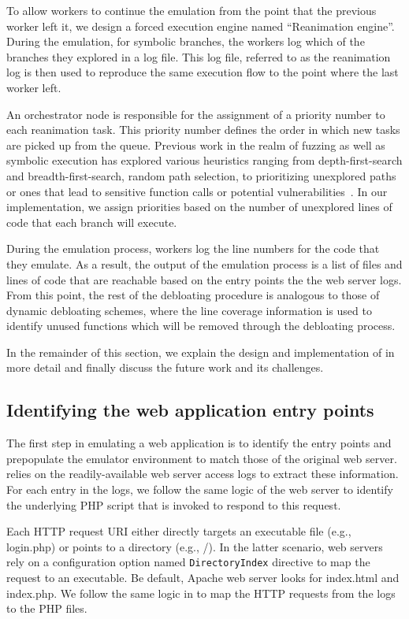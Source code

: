 To allow workers to continue the emulation from the point that the previous worker left it, we design a forced execution engine named ``Reanimation engine''. 
During the emulation, for symbolic branches, the workers log which of the branches they explored in a log file. 
This log file, referred to as the reanimation log is then used to reproduce the same execution flow to the point where the last worker left. 

An orchestrator node is responsible for the assignment of a priority number to each reanimation task. 
This priority number defines the order in which new tasks are picked up from the queue. 
Previous work in the realm of fuzzing as well as symbolic execution has explored various heuristics ranging from depth-first-search and breadth-first-search, random path selection, to prioritizing unexplored paths or ones that lead to sensitive function calls or potential vulnerabilities~\cite{cadar2008klee, cadar2008exe, cha2012unleashing, chipounov2011s2e}. 
In our implementation, we assign priorities based on the number of unexplored lines of code that each branch will execute. 

During the emulation process, workers log the line numbers for the code that they emulate. 
As a result, the output of the emulation process is a list of files and lines of code that are reachable based on the entry points the the web server logs. 
From this point, the rest of the debloating procedure is analogous to those of dynamic debloating schemes, where the line coverage information is used to identify unused functions which will be removed through the debloating process. 

In the remainder of this section, we explain the design and implementation of \animatedead{} in more detail and finally discuss the future work and its challenges. 

\subsection{Identifying the web application entry points}
The first step in emulating a web application is to identify the entry points and prepopulate the emulator environment to match those of the original web server. 
\animatedead{} relies on the readily-available web server access logs to extract these information. 
For each entry in the logs, we follow the same logic of the web server to identify the underlying PHP script that is invoked to respond to this request. 

Each HTTP request URI either directly targets an executable file (e.g., login.php) or points to a directory (e.g., /). 
In the latter scenario, web servers rely on a configuration option named \texttt{DirectoryIndex} directive to map the request to an executable. 
Be default, Apache web server looks for index.html and index.php. 
We follow the same logic in \animatedead{} to map the HTTP requests from the logs to the PHP files. 


